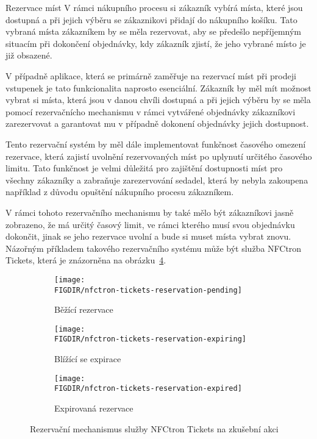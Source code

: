 \begin{subsection}{Rezervace míst}
    \label{subsec:identifikace-nakupni-kosik-rezervace}
    V rámci nákupního procesu si zákazník vybírá místa, které jsou dostupná a při jejich výběru se zákaznikovi přidají do nákupního košíku.
    Tato vybraná místa zákazníkem by se měla rezervovat, aby se předešlo nepříjemným situacím při dokončení objednávky, kdy zákazník zjistí, že jeho vybrané místo je již obsazené.

    V případně aplikace, která se primárně zaměřuje na rezervací míst při prodeji vstupenek je tato funkcionalita naprosto esenciální.
    Zákazník by měl mít možnost vybrat si místa, která jsou v danou chvíli dostupná a při jejich výběru by se měla pomocí rezervačnícho mechanismu v rámci vytvářené objednávky zákazníkovi zarezervovat a garantovat mu v případně dokonení objednávky jejich dostupnost.

    Tento rezervační systém by měl dále implementovat funkčnost časového omezení rezervace, která zajistí uvolnění rezervovaných míst po uplynutí určitého časového limitu.
    Tato funkčnost je velmi důležitá pro zajištění dostupnosti míst pro všechny zákazníky a zabraňuje zarezervování sedadel, která by nebyla zakoupena například z důvodu opuštění nákupního procesu zákazníkem.

    V rámci tohoto rezervačního mechanismu by také mělo být zákazníkovi jasně zobrazeno, že má určitý časový limit, ve rámci kterého musí svou objednávku dokončit, jinak se jeho rezervace uvolní a bude si muset místa vybrat znovu.
    Názořným příkladem takového rezervačního systému může být služba NFCtron Tickets, která je znázorněna na obrázku~\ref{fig:nfctron-tickets-reservation}.

    \begin{figure}[H]
        \centering
        \begin{subfigure}{0.3\textwidth}
            \texttt{[image: \\FIGDIR/nfctron-tickets-reservation-pending]}
            \caption{Běžící rezervace}
            \label{fig:nfctron-tickets-reservation-pending}
        \end{subfigure}
        \hfill
        \begin{subfigure}{0.3\textwidth}
            \texttt{[image: \\FIGDIR/nfctron-tickets-reservation-expiring]}
            \caption{Blížící se expirace}
            \label{fig:nfctron-tickets-reservation-expiring}
        \end{subfigure}
        \hfill
        \begin{subfigure}{0.3\textwidth}
            \texttt{[image: \\FIGDIR/nfctron-tickets-reservation-expired]}
            \caption{Expirovaná rezervace}
            \label{fig:nfctron-tickets-reservation-expired}
        \end{subfigure}

        \caption{Rezervační mechanismus služby NFCtron Tickets na zkušební akci\cite{nt_nfctron_simonfest}}
        \label{fig:nfctron-tickets-reservation}
    \end{figure}
\end{subsection}
